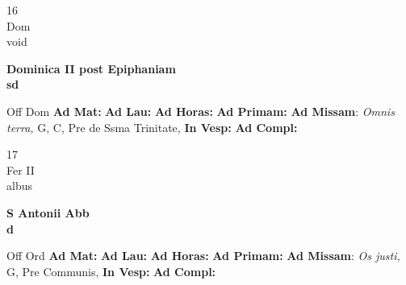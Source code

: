 \documentclass[10pt, openany]{book}
\begin{document}
    \begin{center}
        \begin{minipage}{3.5in}
            \vspace{2em}
            \begin{minipage}{0.5in}
                {\Huge 16} \\
                {\normalsize Dom} \\
                {\normalsize void}
            \end{minipage}
            \begin{minipage}{3.0in}
                \textbf{ \large Dominica II post Epiphaniam \\
                \textnormal{\normalsize sd}} \\ 
            \end{minipage}
            \begin{justify}Off Dom
                \textbf{Ad Mat: }
                \textbf{Ad Lau: }
                \textbf{Ad Horas: }
                \textbf{Ad Primam: }\textbf{Ad Missam}: \textit{Omnis terra,} G, C, Pre de Ssma Trinitate,  
                \textbf{In Vesp: }
                \textbf{Ad Compl: }
            \end{justify}
        \end{minipage}
    \end{center}

    \begin{center}
        \begin{minipage}{3.5in}
            \vspace{2em}
            \begin{minipage}{0.5in}
                {\Huge 17} \\
                {\normalsize Fer II} \\
                {\normalsize albus}
            \end{minipage}
            \begin{minipage}{3.0in}
                \textbf{ \large S Antonii Abb \\
                \textnormal{\normalsize d}} \\ 
            \end{minipage}
            \begin{justify}Off Ord
                \textbf{Ad Mat: }
                \textbf{Ad Lau: }
                \textbf{Ad Horas: }
                \textbf{Ad Primam: }\textbf{Ad Missam}: \textit{Os justi,} G, Pre Communis,  
                \textbf{In Vesp: }
                \textbf{Ad Compl: }
            \end{justify}
        \end{minipage}
    \end{center}
\end{document}
